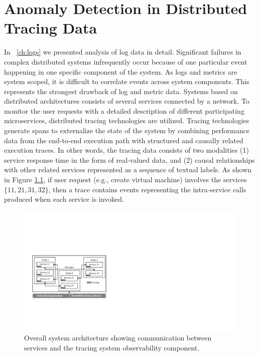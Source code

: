 
\chapter{Anomaly Detection in Distributed Tracing Data} %

\label{ch:traces} %
\minitoc
\bigskip

In ~\autoref{ch:logs} we presented analysis of log data in detail. Significant failures in complex distributed systems infrequently occur because of one particular event happening in one specific component of the system. As logs and metrics are system scoped, it is difficult to correlate events across system components. This represents the strongest drawback of log and metric data. Systems based on distributed architectures consists of several services connected by a network. To monitor the user requests with a detailed description of different participating microservices, distributed tracing technologies are utilized. Tracing technologies~\cite{36356, kaldor2017canopy,Fonseca:2007:XPN:1973430.1973450} generate spans to externalize the state of the system by combining performance data from the end-to-end execution path with structured and causally related execution traces. In other words, the tracing data consists of two modalities (1) service response time in the form of real-valued data, and (2) causal relationships with other related services represented as a sequence of textual labels. As shown in Figure \ref{fig:traces}, if user request (e.g., create virtual machine) involves the services $\{11, 21, 31, 32\}$, then a trace contains events representing the intra-service calls produced when each service is invoked. 

\begin{figure}[!t]
\centerline{\includegraphics[scale=1.0]{gfx/chap6/tracingshowcase.pdf}}
\caption{Overall system architecture showing communication between services and the tracing system observability component.}
\label{fig:traces}
\end{figure}

